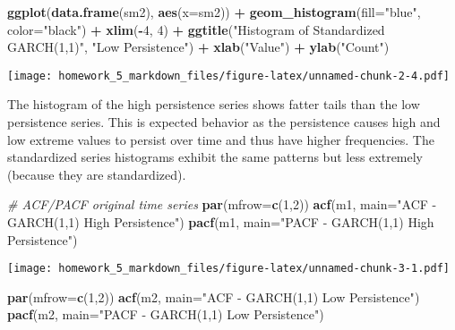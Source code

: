 \documentclass[]{article}
\newenvironment{Shaded}{\begin{snugshade}}{\end{snugshade}}
\newcommand{\KeywordTok}[1]{\textcolor[rgb]{0.13,0.29,0.53}{\textbf{#1}}}
\newcommand{\DataTypeTok}[1]{\textcolor[rgb]{0.13,0.29,0.53}{#1}}
\newcommand{\DecValTok}[1]{\textcolor[rgb]{0.00,0.00,0.81}{#1}}
\newcommand{\StringTok}[1]{\textcolor[rgb]{0.31,0.60,0.02}{#1}}
\newcommand{\CommentTok}[1]{\textcolor[rgb]{0.56,0.35,0.01}{\textit{#1}}}
\newcommand{\OperatorTok}[1]{\textcolor[rgb]{0.81,0.36,0.00}{\textbf{#1}}}
\newcommand{\NormalTok}[1]{#1}
\begin{document}
\begin{Shaded}
\begin{Highlighting}[]
\KeywordTok{ggplot}\NormalTok{(}\KeywordTok{data.frame}\NormalTok{(sm2), }\KeywordTok{aes}\NormalTok{(}\DataTypeTok{x=}\NormalTok{sm2)) }\OperatorTok{+}
\StringTok{  }\KeywordTok{geom_histogram}\NormalTok{(}\DataTypeTok{fill=}\StringTok{"blue"}\NormalTok{, }\DataTypeTok{color=}\StringTok{"black"}\NormalTok{) }\OperatorTok{+}
\StringTok{  }\KeywordTok{xlim}\NormalTok{(}\OperatorTok{-}\DecValTok{4}\NormalTok{, }\DecValTok{4}\NormalTok{) }\OperatorTok{+}
\StringTok{  }\KeywordTok{ggtitle}\NormalTok{(}\StringTok{"Histogram of Standardized GARCH(1,1)"}\NormalTok{, }\StringTok{"Low Persistence"}\NormalTok{) }\OperatorTok{+}
\StringTok{  }\KeywordTok{xlab}\NormalTok{(}\StringTok{"Value"}\NormalTok{) }\OperatorTok{+}
\StringTok{  }\KeywordTok{ylab}\NormalTok{(}\StringTok{"Count"}\NormalTok{)}
\end{Highlighting}
\end{Shaded}

\texttt{[image: homework\_5\_markdown\_files/figure-latex/unnamed-chunk-2-4.pdf]}

The histogram of the high persistence series shows fatter tails than the
low persistence series. This is expected behavior as the persistence
causes high and low extreme values to persist over time and thus have
higher frequencies. The standardized series histograms exhibit the same
patterns but less extremely (because they are standardized).

\begin{Shaded}
\begin{Highlighting}[]
\CommentTok{# ACF/PACF original time series}
\KeywordTok{par}\NormalTok{(}\DataTypeTok{mfrow=}\KeywordTok{c}\NormalTok{(}\DecValTok{1}\NormalTok{,}\DecValTok{2}\NormalTok{))}
\KeywordTok{acf}\NormalTok{(m1, }\DataTypeTok{main=}\StringTok{"ACF - GARCH(1,1) High Persistence"}\NormalTok{)}
\KeywordTok{pacf}\NormalTok{(m1, }\DataTypeTok{main=}\StringTok{"PACF - GARCH(1,1) High Persistence"}\NormalTok{)}
\end{Highlighting}
\end{Shaded}

\texttt{[image: homework\_5\_markdown\_files/figure-latex/unnamed-chunk-3-1.pdf]}

\begin{Shaded}
\begin{Highlighting}[]
\KeywordTok{par}\NormalTok{(}\DataTypeTok{mfrow=}\KeywordTok{c}\NormalTok{(}\DecValTok{1}\NormalTok{,}\DecValTok{2}\NormalTok{))}
\KeywordTok{acf}\NormalTok{(m2, }\DataTypeTok{main=}\StringTok{"ACF - GARCH(1,1) Low Persistence"}\NormalTok{)}
\KeywordTok{pacf}\NormalTok{(m2, }\DataTypeTok{main=}\StringTok{"PACF - GARCH(1,1) Low Persistence"}\NormalTok{)}
\end{Highlighting}
\end{Shaded}
\end{document}
